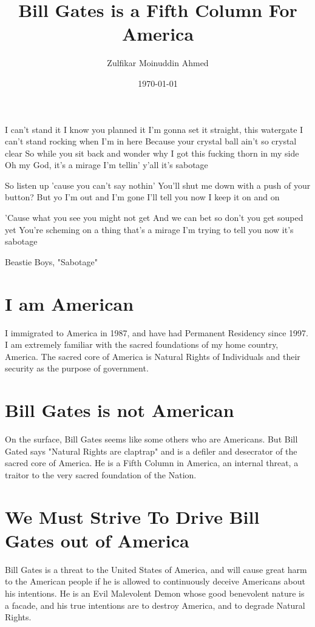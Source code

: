 \documentclass{amsart}
\title{Bill Gates is a Fifth Column For America}
\author{Zulfikar Moinuddin Ahmed}
\date{\today}
\begin{document}
\maketitle
\epigraph{I can't stand it I know you planned it
I'm gonna set it straight, this watergate
I can't stand rocking when I'm in here
Because your crystal ball ain't so crystal clear
So while you sit back and wonder why
I got this fucking thorn in my side
Oh my God, it's a mirage
I'm tellin' y'all it's sabotage

So listen up 'cause you can't say nothin'
You'll shut me down with a push of your button?
But yo I'm out and I'm gone
I'll tell you now I keep it on and on

'Cause what you see you might not get
And we can bet so don't you get souped yet
You're scheming on a thing that's a mirage
I'm trying to tell you now it's sabotage}{Beastie Boys, "Sabotage"}

\section{I am American}
I immigrated to America in 1987, and have had Permanent Residency since 1997.  I am extremely familiar with the sacred foundations of my home country, America.  The sacred core of America is Natural Rights of Individuals and their security as the purpose of government.  

\section{Bill Gates is not American}

On the surface, Bill Gates seems like some others who are Americans.  But Bill Gated says "Natural Rights are claptrap" and is a defiler and desecrator of the sacred core of America.  He is a Fifth Column in America, an internal threat, a traitor to the very sacred foundation of the Nation.

\section{We Must Strive To Drive Bill Gates out of America}

Bill Gates is a threat to the United States of America, and will cause great harm to the American people if he is allowed to continuously deceive Americans about his intentions.  He is an Evil Malevolent Demon whose good benevolent nature is a facade, and his true intentions are to destroy America, and to degrade Natural Rights.
\end{document}
